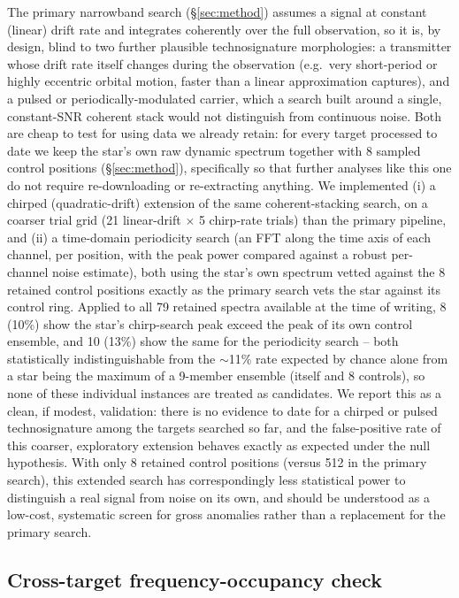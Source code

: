 \documentclass{openjournal}
\begin{document}
The primary narrowband search (\S\ref{sec:method}) assumes a signal at
constant (linear) drift rate and integrates coherently over the full
observation, so it is, by design, blind to two further plausible
technosignature morphologies: a transmitter whose drift rate itself
changes during the observation (e.g.\ very short-period or highly
eccentric orbital motion, faster than a linear approximation captures),
and a pulsed or periodically-modulated carrier, which a search built
around a single, constant-SNR coherent stack would not distinguish from
continuous noise. Both are cheap to test for using data we already
retain: for every target processed to date we keep the star's own raw
dynamic spectrum together with 8 sampled control positions
(\S\ref{sec:method}), specifically so that further analyses like this
one do not require re-downloading or re-extracting anything. We
implemented (i) a chirped (quadratic-drift) extension of the same
coherent-stacking search, on a coarser trial grid (21 linear-drift $\times$
5 chirp-rate trials) than the primary pipeline, and (ii) a time-domain
periodicity search (an FFT along the time axis of each channel, per
position, with the peak power compared against a robust per-channel
noise estimate), both using the star's own spectrum vetted against the 8
retained control positions exactly as the primary search vets the star
against its control ring. Applied to all 79 retained spectra available
at the time of writing, 8 (10\%) show the star's chirp-search peak
exceed the peak of its own control ensemble, and 10 (13\%) show the same
for the periodicity search -- both statistically indistinguishable from
the $\sim$11\% rate expected by chance alone from a star being the
maximum of a 9-member ensemble (itself and 8 controls), so none of these
individual instances are treated as candidates. We report this as a
clean, if modest, validation: there is no evidence to date for a
chirped or pulsed technosignature among the targets searched so far,
and the false-positive rate of this coarser, exploratory extension
behaves exactly as expected under the null hypothesis. With only 8
retained control positions (versus 512 in the primary search), this
extended search has correspondingly less statistical power to
distinguish a real signal from noise on its own, and should be
understood as a low-cost, systematic screen for gross anomalies rather
than a replacement for the primary search.

\subsection{Cross-target frequency-occupancy check}
\label{sec:freqoccupancy}
\end{document}

